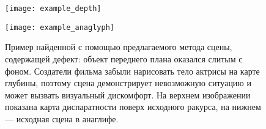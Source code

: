 \begin{figure}[!h]
	\begin{minipage}[b]{1.0\linewidth}
		\centering
		\centerline{ \texttt{[image: example\_depth]} }
	\end{minipage}
	\begin{minipage}[b]{1.0\linewidth}
		\centering
		\centerline{ \texttt{[image: example\_anaglyph]} }
	\end{minipage}
    \caption{Пример найденной с помощью предлагаемого метода сцены, содержащей дефект: объект переднего плана оказался слитым с фоном. Создатели фильма забыли нарисовать тело актрисы на карте глубины, поэтому сцена демонстрирует невозможную ситуацию и может вызвать визуальный дискомфорт. На верхнем изображении показана карта диспаратности поверх исходного ракурса, на нижнем --- исходная сцена в анаглифе. }
	\label{fig:example}
\end{figure}
